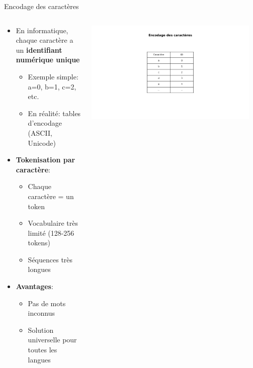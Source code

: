 \documentclass[aspectratio=169,11pt]{beamer}
\begin{document}
\begin{frame}{Encodage des caractères}
    \begin{columns}
        \begin{column}{0.55\textwidth}
            \begin{itemize}
                \item En informatique, chaque caractère a un \textbf{identifiant numérique unique}
                \begin{itemize}
                    \item Exemple simple: a=0, b=1, c=2, etc.
                    \item En réalité: tables d'encodage (ASCII, Unicode)
                \end{itemize}
                \vspace{0.1cm}
                \item \textbf{Tokenisation par caractère}:
                \begin{itemize}
                    \item Chaque caractère = un token
                    \item Vocabulaire très limité (128-256 tokens)
                    \item Séquences très longues
                \end{itemize}
                \vspace{0.1cm}
                \item \textbf{Avantages}:
                \begin{itemize}
                    \item Pas de mots inconnus
                    \item Solution universelle pour toutes les langues
                \end{itemize}
            \end{itemize}
        \end{column}
        \begin{column}{0.45\textwidth}
            \includegraphics[width=0.95\textwidth]{images/generated/char_tokenization.png}

\end{column}
\end{columns}
\end{frame}
\end{document}
